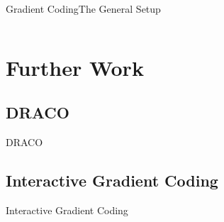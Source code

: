 \documentclass{beamer}
\begin{document}
\begin{frame}{Gradient Coding}{The General Setup}
\begin{columns}
\begin{column}{.5\linewidth}
\end{column}

\end{columns}

\end{frame}

\section{Further Work}

\subsection{DRACO}

\begin{frame}{DRACO}

\end{frame}

\subsection{Interactive Gradient Coding}

\begin{frame}{Interactive Gradient Coding}

\end{frame}
\end{document}
